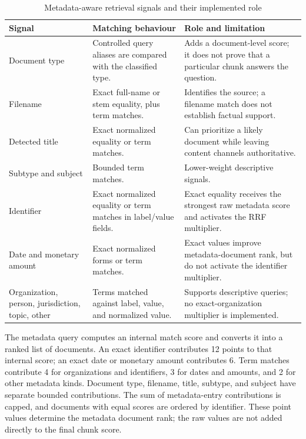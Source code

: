 \begin{table}[!htbp]
	\centering
	\caption{Metadata-aware retrieval signals and their implemented role}
	\label{tab:retrieval-metadata-signals}
	\small
	\begin{tabular}{@{}p{3.2cm}p{5.1cm}p{5.8cm}@{}}
		\toprule
		Signal & Matching behaviour & Role and limitation \\
		\midrule
		Document type & Controlled query aliases are compared with the classified type. & Adds a document-level score; it does not prove that a particular chunk answers the question. \\
		Filename & Exact full-name or stem equality, plus term matches. & Identifies the source; a filename match does not establish factual support. \\
		Detected title & Exact normalized equality or term matches. & Can prioritize a likely document while leaving content channels authoritative. \\
		Subtype and subject & Bounded term matches. & Lower-weight descriptive signals. \\
		Identifier & Exact normalized equality or term matches in label/value fields. & Exact equality receives the strongest raw metadata score and activates the RRF multiplier. \\
		Date and monetary amount & Exact normalized forms or term matches. & Exact values improve metadata-document rank, but do not activate the identifier multiplier. \\
		Organization, person, jurisdiction, topic, other & Terms matched against label, value, and normalized value. & Supports descriptive queries; no exact-organization multiplier is implemented. \\
		\bottomrule
	\end{tabular}
\end{table}

The metadata query computes an internal match score and converts it into a ranked list of documents. An exact identifier contributes 12 points to that internal score; an exact date or monetary amount contributes 6. Term matches contribute 4 for organizations and identifiers, 3 for dates and amounts, and 2 for other metadata kinds. Document type, filename, title, subtype, and subject have separate bounded contributions. The sum of metadata-entry contributions is capped, and documents with equal scores are ordered by identifier. These point values determine the metadata document rank; the raw values are not added directly to the final chunk score.

